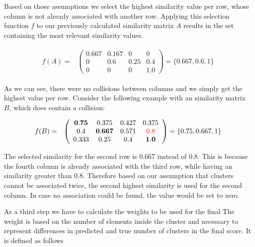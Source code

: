 Based on those assumptions we select the highest similarity value per row, whose column is not already associated with another row. Applying this selection function $f$ to our previously calculated similarity matrix $A$ results in the set containing the most relevant similarity values.

\begin{gather*}
    \begin{array}{rcl}
        f(A) = & \left(\begin{array}{cccc}
            \mathbf{0.667} & 0.167 & 0 & 0 \\
            0 & \mathbf{0.6} & 0.25 & 0.4 \\
            0 &  0 & 0 & \mathbf{1.0} \end{array}\right)
            = \{0.667, 0.6, 1\}
    \end{array}
\end{gather*}

As we can see, there were no collisions between columns and we simply get the highest value per row. Consider the following example with an similarity matrix $B$, which does contain a collision:

\begin{gather*}
    \begin{array}{rcl}
        f(B) = & \left(\begin{array}{cccc}
            \mathbf{0.75} & 0.375 & 0.427 & 0.375 \\
            0.4 & \mathbf{0.667} & 0.571 & \textcolor{red}{0.8} \\
            0.333 &  0.25 & 0.4 & \mathbf{1.0} \end{array}\right)
            = \{0.75, 0.667, 1\}
    \end{array}
\end{gather*}

The selected similarity for the second row is 0.667 instead of 0.8. This is because the fourth column is already associated with the third row, while having an similarity greater than 0.8. Therefore based on our assumption that clusters cannot be associated twice, the second highest similarity is used for the second column. In case no association could be found, the value would be set to zero. 

As a third step we have to calculate the weights to be used for the final  The weight is based on the number of elements inside the cluster and necessary to represent differences in predicted and true number of clusters in the final score. It is defined as follows

